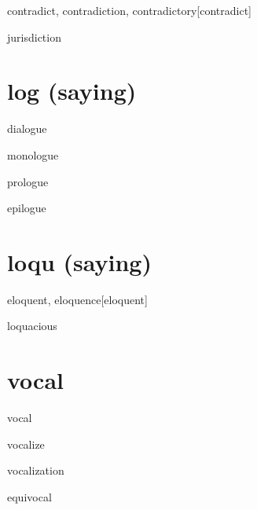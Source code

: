 \begin{RefWord}{contradict, contradiction, contradictory}[contradict]
\end{RefWord}

\begin{RefWord}{jurisdiction}
\end{RefWord}

\section{log (saying)}

\begin{RefWord}{dialogue}
\end{RefWord}

\begin{RefWord}{monologue}
\end{RefWord}

\begin{RefWord}{prologue}
\end{RefWord}

\begin{RefWord}{epilogue}
\end{RefWord}

\section{loqu (saying)}

\begin{RefWord}{eloquent, eloquence}[eloquent]
\end{RefWord}

\begin{RefWord}{loquacious}
\end{RefWord}

\section{vocal}

\begin{RefWord}{vocal}
\end{RefWord}

\begin{RefWord}{vocalize}
\end{RefWord}

\begin{RefWord}{vocalization}
\end{RefWord}

\begin{RefWord}{equivocal}
\end{RefWord}